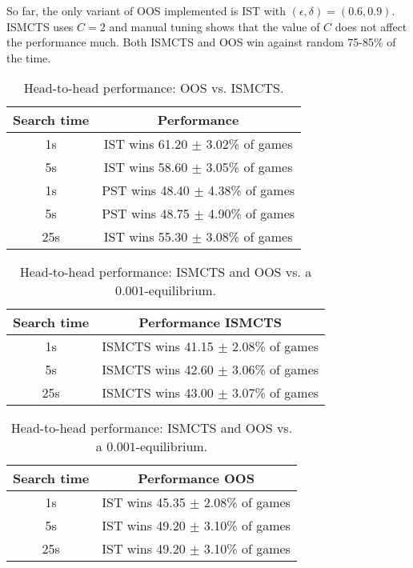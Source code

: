 \documentclass[letterpaper]{article}
\begin{document}
So far, the only variant of OOS implemented is IST with $(\epsilon, \delta) = (0.6, 0.9)$. 
ISMCTS uses $C = 2$ and manual tuning shows that the value of $C$ does not 
affect the performance much. Both ISMCTS and OOS win against random 75-85\% of the time.

\begin{table}[h!]
\begin{center}
\begin{tabular}{|c|c|}
\hline
Search time & Performance \\
\hline
    1s      & IST wins 61.20 $\pm$ 3.02\% of games \\
    5s      & IST wins 58.60 $\pm$ 3.05\% of games \\
\hline
    1s      & PST wins 48.40 $\pm$ 4.38\% of games \\
    5s      & PST wins 48.75 $\pm$ 4.90\% of games \\
\hline
    25s     & IST wins 55.30 $\pm$ 3.08\% of games \\
\hline
\end{tabular}
\caption{Head-to-head performance: OOS vs. ISMCTS.}
\end{center}
\end{table}

\begin{table}[h!]
\begin{center}
\begin{tabular}{|c|c|}
\hline
Search time & Performance ISMCTS \\
\hline
    1s      & ISMCTS wins 41.15 $\pm$ 2.08\% of games \\
    5s      & ISMCTS wins 42.60 $\pm$ 3.06\% of games \\
    25s     & ISMCTS wins 43.00 $\pm$ 3.07\% of games \\
\hline
\end{tabular}

\vspace{0.3cm}

\begin{tabular}{|c|c|}
\hline
Search time & Performance OOS \\
\hline
    1s      & IST wins 45.35 $\pm$ 2.08\% of games \\
    5s      & IST wins 49.20 $\pm$ 3.10\% of games \\
    25s     & IST wins 49.20 $\pm$ 3.10\% of games \\
\hline
\end{tabular}
\caption{Head-to-head performance: ISMCTS and OOS vs. a $0.001$-equilibrium. }
\end{center}
\end{table}
\end{document}
